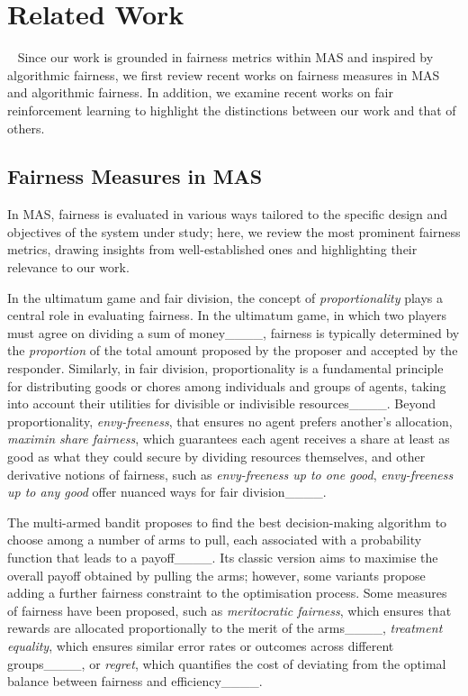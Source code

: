 \section{Related Work}
~\label{RelatedWork}
Since our work is grounded in fairness metrics within MAS and inspired by algorithmic fairness, we first review recent works on fairness measures in MAS and algorithmic fairness. In addition, we examine recent works on fair reinforcement learning to highlight the distinctions between our work and that of others.

\subsection{Fairness Measures in MAS}
In MAS, fairness is evaluated in various ways tailored to the specific design and objectives of the system under study; here, we review the most prominent fairness metrics, drawing insights from well-established ones and highlighting their relevance to our work. 

In the ultimatum game and fair division, the concept of \textit{proportionality} plays a central role in evaluating fairness.
In the ultimatum game, in which two players must agree on dividing a sum of money____, fairness is typically determined by the \textit{proportion} of the total amount proposed by the proposer and accepted by the responder. Similarly, in fair division, proportionality is a fundamental principle for distributing goods or chores among individuals and groups of agents, taking into account their utilities for divisible or indivisible resources____. Beyond proportionality, \textit{envy-freeness}, that ensures no agent prefers another's allocation, \textit{maximin share fairness}, which guarantees each agent receives a share at least as good as what they could secure by dividing resources themselves, and other derivative notions of fairness, such as \textit{envy-freeness up to one good}, \textit{envy-freeness up to any good} offer nuanced ways for fair division____. 

The multi-armed bandit proposes to find the best decision-making algorithm to choose among a number of arms to pull, each associated with a probability function that leads to a payoff____. Its classic version aims to maximise the overall payoff obtained by pulling the arms; however, some variants propose adding a further fairness constraint to the optimisation process. Some measures of fairness have been proposed, such as \textit{meritocratic fairness}, which ensures that rewards are allocated proportionally to the merit of the arms____, \textit{treatment equality}, which ensures similar error rates or outcomes across different groups____, or \textit{regret}, which quantifies the cost of deviating from the optimal balance between fairness and efficiency____.

